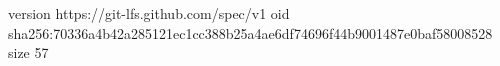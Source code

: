 version https://git-lfs.github.com/spec/v1
oid sha256:70336a4b42a285121ec1cc388b25a4ae6df74696f44b9001487e0baf58008528
size 57
